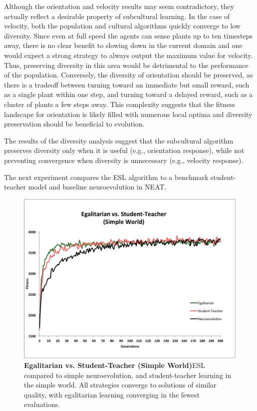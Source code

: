 \documentclass{sig-alternate}
\begin{document}
Although the orientation and velocity results may seem contradictory, they actually reflect a desirable property of subcultural learning. In the case of velocity, both the population and cultural algorithms quickly converge to low diversity. Since even at full speed the agents can sense plants up to ten timesteps away, there is no clear benefit to slowing down in the current domain and one would expect a strong strategy to always output the maximum value for velocity. Thus, preserving diversity in this area would be detrimental to the performance of the population. Conversely, the diversity of orientation should be preserved, as there is a tradeoff between turning toward an immediate but small reward, such as a single plant within one step, and turning toward a delayed reward, such as a cluster of plants a few steps away. This complexity suggests that the fitness landscape for orientation  is likely filled with numerous local optima and diversity preservation should be beneficial to evolution. 

The results of the diversity analysis suggest that the subcultural algorithm preserves diversity only when it is useful (e.g., orientation response), while not preventing convergence when diversity is unnecessary (e.g., velocity response).

The next experiment compares the ESL algorithm to a benchmark student-teacher model and baseline neuroevolution in NEAT.

\begin{figure}[t]
  \centering
    \includegraphics[scale=.41]{egalitarian_vs_student_teacher_simple.pdf}
  \caption{\textbf{Egalitarian vs. Student-Teacher (Simple World)}ESL compared to simple neuroevolution, and student-teacher learning in the simple world. All strategies converge to solutions of similar quality, with egalitarian learning converging in the fewest evaluations.}
  \label{fig:reward-studentteacher-simple}
\end{figure}
\end{document}
